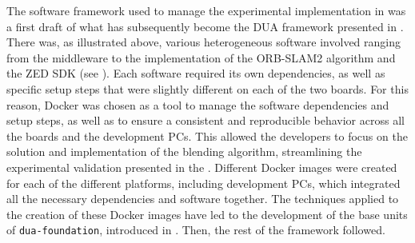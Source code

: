 The software framework used to manage the experimental implementation in \cite{bianchi_efficient_2023} was a first draft of what has subsequently become the DUA framework presented in . There was, as illustrated above, various heterogeneous software involved ranging from the \ROS middleware to the implementation of the ORB-SLAM2 algorithm and the ZED SDK (see ). Each software required its own dependencies, as well as specific setup steps that were slightly different on each of the two boards. For this reason, Docker was chosen as a tool to manage the software dependencies and setup steps, as well as to ensure a consistent and reproducible behavior across all the boards and the development PCs. This allowed the developers to focus on the solution and implementation of the blending algorithm, streamlining the experimental validation presented in the \cite{bianchi_efficient_2023}. Different Docker images were created for each of the different platforms, including development PCs, which integrated all the necessary dependencies and software together. The techniques applied to the creation of these Docker images have led to the development of the base units of \texttt{dua-foundation}, introduced in . Then, the rest of the framework followed.
